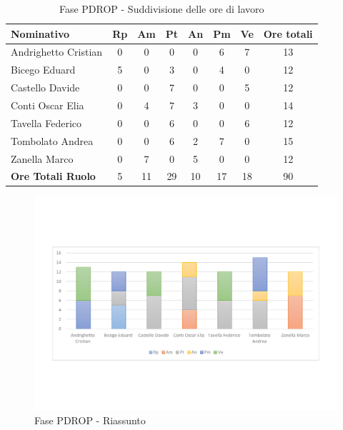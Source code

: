 \documentclass[../PianoProgetto.tex]{subfiles}
\begin{document}
	\begin{table}[h]
		\begin{tabularx}{\textwidth}{l  * {6}{C}  c}
			\toprule
			\textbf{Nominativo} & \textbf{Rp} & \textbf{Am} & \textbf{Pt} 
						& \textbf{An} & \textbf{Pm} & \textbf{Ve} & \textbf{Ore totali} \\
			\midrule
			Andrighetto Cristian & 0 & 0 & 0 & 0 & 6 & 7 & 13 \\
			Bicego Eduard & 5 & 0 &	3 &	0 &	4 &	0 &	12 \\
			Castello Davide & 0 & 0 & 7 & 0 & 0 & 5 & 12 \\
			Conti Oscar Elia &0 & 4 & 7 & 3 & 0 & 0 & 14 \\
			Tavella Federico &	0 & 0 & 6 & 0 & 0 & 6 & 12 \\
			Tombolato Andrea & 0 & 0 & 6 & 2 & 7 & 0 & 15 \\
			Zanella Marco & 0 & 7 & 0 & 5 & 0 & 0 & 12 \\
			\midrule			
			\textbf{Ore Totali Ruolo} & 5 & 11 & 29 & 10 & 17 & 18 & 90 \\
			\bottomrule
		\end{tabularx}
		\caption{Fase PDROP - Suddivisione delle ore di lavoro}
		\label{tab:fasePDROP_ore}
	\end{table}
	
\newpage
\vfill	
		
	\begin{figure}[!h]
		\centering
		\includegraphics[width=\textwidth , trim=2cm 5cm 2cm 5cm]{grafici/PDROP/PDROP-ore-persona}
			\caption{Fase PDROP - Riassunto}
		\label{fig:BarChart-fasePDROP_ore}
	\end{figure}
\vfill	
	
\end{document}
